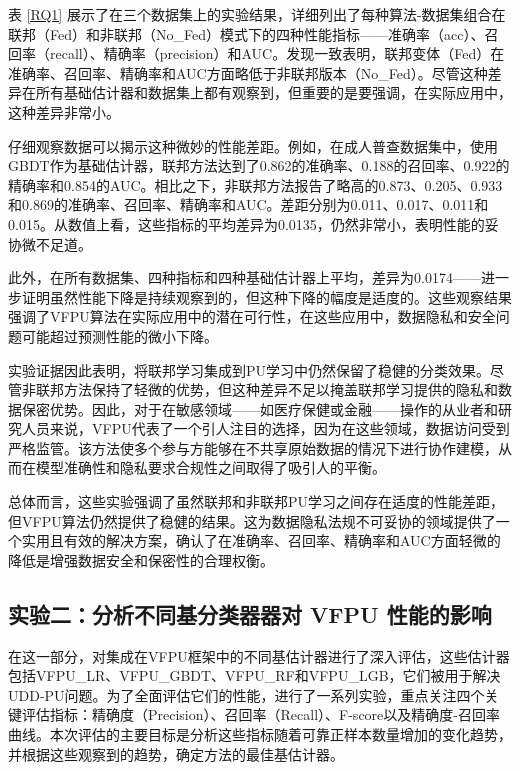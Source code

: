 \vspace{-0.1cm}

表 \ref{RQ1} 展示了在三个数据集上的实验结果，详细列出了每种算法-数据集组合在联邦（Fed）和非联邦（No\_Fed）模式下的四种性能指标——准确率（acc）、召回率（recall）、精确率（precision）和AUC。发现一致表明，联邦变体（Fed）在准确率、召回率、精确率和AUC方面略低于非联邦版本（No\_Fed）。尽管这种差异在所有基础估计器和数据集上都有观察到，但重要的是要强调，在实际应用中，这种差异非常小。

仔细观察数据可以揭示这种微妙的性能差距。例如，在成人普查数据集中，使用GBDT作为基础估计器，联邦方法达到了0.862的准确率、0.188的召回率、0.922的精确率和0.854的AUC。相比之下，非联邦方法报告了略高的0.873、0.205、0.933和0.869的准确率、召回率、精确率和AUC。差距分别为0.011、0.017、0.011和0.015。从数值上看，这些指标的平均差异为0.0135，仍然非常小，表明性能的妥协微不足道。

此外，在所有数据集、四种指标和四种基础估计器上平均，差异为0.0174——进一步证明虽然性能下降是持续观察到的，但这种下降的幅度是适度的。这些观察结果强调了VFPU算法在实际应用中的潜在可行性，在这些应用中，数据隐私和安全问题可能超过预测性能的微小下降。

实验证据因此表明，将联邦学习集成到PU学习中仍然保留了稳健的分类效果。尽管非联邦方法保持了轻微的优势，但这种差异不足以掩盖联邦学习提供的隐私和数据保密优势。因此，对于在敏感领域——如医疗保健或金融——操作的从业者和研究人员来说，VFPU代表了一个引人注目的选择，因为在这些领域，数据访问受到严格监管。该方法使多个参与方能够在不共享原始数据的情况下进行协作建模，从而在模型准确性和隐私要求合规性之间取得了吸引人的平衡。

总体而言，这些实验强调了虽然联邦和非联邦PU学习之间存在适度的性能差距，但VFPU算法仍然提供了稳健的结果。这为数据隐私法规不可妥协的领域提供了一个实用且有效的解决方案，确认了在准确率、召回率、精确率和AUC方面轻微的降低是增强数据安全和保密性的合理权衡。

\subsection{实验二：分析不同基分类器器对 VFPU 性能的影响}

在这一部分，对集成在VFPU框架中的不同基估计器进行了深入评估，这些估计器包括VFPU\_LR、VFPU\_GBDT、VFPU\_RF和VFPU\_LGB，它们被用于解决UDD-PU问题。为了全面评估它们的性能，进行了一系列实验，重点关注四个关键评估指标：精确度（Precision）、召回率（Recall）、F-score以及精确度-召回率曲线。本次评估的主要目标是分析这些指标随着可靠正样本数量增加的变化趋势，并根据这些观察到的趋势，确定方法的最佳基估计器。

